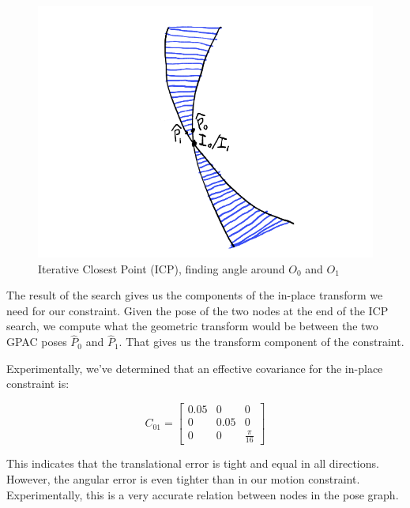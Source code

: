 \begin{figure}[htbp]
\centering
\includegraphics[keepaspectratio,width=400pt,height=0.75\textheight]{5_inplace_ICP.png}
\caption{Iterative Closest Point (ICP), finding angle around $O_0$ and $O_1$}
\label{fig:inplace_icp}
\end{figure}



The result of the search gives us the components of the in-place transform we need for our constraint. Given the pose of the two nodes at the end of the ICP search, we compute what the geometric transform would be between the two GPAC poses $\hat{P}_0$ and $\hat{P}_1$. That gives us the transform component of the constraint.

Experimentally, we've determined that an effective covariance for the in-place constraint is:


\begin{equation}
C_{01} = 
\begin{bmatrix}
0.05 & 0 & 0 \\
0 & 0.05 & 0 \\
0 & 0 & \frac{\pi}{16}
\end{bmatrix}
\end{equation}


This indicates that the translational error is tight and equal in all directions. However, the angular error is even tighter than in our motion constraint. Experimentally, this is a very accurate relation between nodes in the pose graph.





